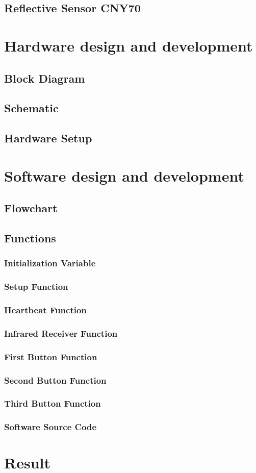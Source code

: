 \documentclass{scrartcl}                    %
\begin{document}
    \subsection{Reflective Sensor CNY70}

\section{Hardware design and development}
    \subsection{Block Diagram}
    \subsection{Schematic}
    \subsection{Hardware Setup}

\section{Software design and development}
    \subsection{Flowchart}
    \subsection{Functions}
            \subsubsection{Initialization Variable}
            \subsubsection{Setup Function}
            \subsubsection{Heartbeat Function}
            \subsubsection{Infrared Receiver Function}
            \subsubsection{First Button Function}
            \subsubsection{Second Button Function}
            \subsubsection{Third Button Function}
            \subsubsection{Software Source Code}
            
\section{Result}

\printbibliography
\end{document}
